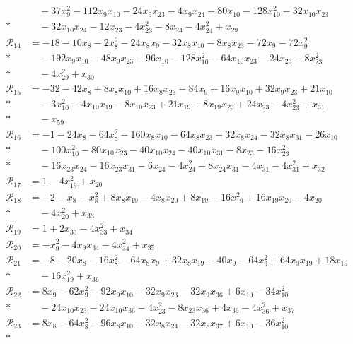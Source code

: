 \begin{align*}
&\quad -37x_{9}^{2} -112x_{9}x_{10} -24x_{9}x_{23} -4x_{9}x_{24} -80x_{10} -128x_{10}^{2} -32x_{10}x_{23} \\*
&\quad -32x_{10}x_{24} -12x_{23} -4x_{23}^{2} -8x_{24} -4x_{24}^{2} +x_{29} \\
\mathcal R_{14} &= -18 -10x_{8} -2x_{8}^{2} -24x_{8}x_{9} -32x_{8}x_{10} -8x_{8}x_{23} -72x_{9} -72x_{9}^{2} \\*
&\quad -192x_{9}x_{10} -48x_{9}x_{23} -96x_{10} -128x_{10}^{2} -64x_{10}x_{23} -24x_{23} -8x_{23}^{2} \\*
&\quad -4x_{29}^{2} +x_{30} \\
\mathcal R_{15} &= -32 -42x_{8} +8x_{8}x_{10} +16x_{8}x_{23} -84x_{9} +16x_{9}x_{10} +32x_{9}x_{23} +21x_{10} \\*
&\quad -3x_{10}^{2} -4x_{10}x_{19} -8x_{10}x_{23} +21x_{19} -8x_{19}x_{23} +24x_{23} -4x_{23}^{2} +x_{31} \\*
&\quad -x_{59} \\
\mathcal R_{16} &= -1 -24x_{8} -64x_{8}^{2} -160x_{8}x_{10} -64x_{8}x_{23} -32x_{8}x_{24} -32x_{8}x_{31} -26x_{10} \\*
&\quad -100x_{10}^{2} -80x_{10}x_{23} -40x_{10}x_{24} -40x_{10}x_{31} -8x_{23} -16x_{23}^{2} \\*
&\quad -16x_{23}x_{24} -16x_{23}x_{31} -6x_{24} -4x_{24}^{2} -8x_{24}x_{31} -4x_{31} -4x_{31}^{2} +x_{32} \\
\mathcal R_{17} &= 1 -4x_{19}^{2} +x_{20} \\
\mathcal R_{18} &= -2 -x_{8} -x_{8}^{2} +8x_{8}x_{19} -4x_{8}x_{20} +8x_{19} -16x_{19}^{2} +16x_{19}x_{20} -4x_{20} \\*
&\quad -4x_{20}^{2} +x_{33} \\
\mathcal R_{19} &= 1 +2x_{33} -4x_{33}^{2} +x_{34} \\
\mathcal R_{20} &= -x_{9}^{2} -4x_{9}x_{34} -4x_{34}^{2} +x_{35} \\
\mathcal R_{21} &= -8 -20x_{8} -16x_{8}^{2} -64x_{8}x_{9} +32x_{8}x_{19} -40x_{9} -64x_{9}^{2} +64x_{9}x_{19} +18x_{19} \\*
&\quad -16x_{19}^{2} +x_{36} \\
\mathcal R_{22} &= 8x_{9} -62x_{9}^{2} -92x_{9}x_{10} -32x_{9}x_{23} -32x_{9}x_{36} +6x_{10} -34x_{10}^{2} \\*
&\quad -24x_{10}x_{23} -24x_{10}x_{36} -4x_{23}^{2} -8x_{23}x_{36} +4x_{36} -4x_{36}^{2} +x_{37} \\
\mathcal R_{23} &= 8x_{8} -64x_{8}^{2} -96x_{8}x_{10} -32x_{8}x_{24} -32x_{8}x_{37} +6x_{10} -36x_{10}^{2} \\*

\end{align*}
